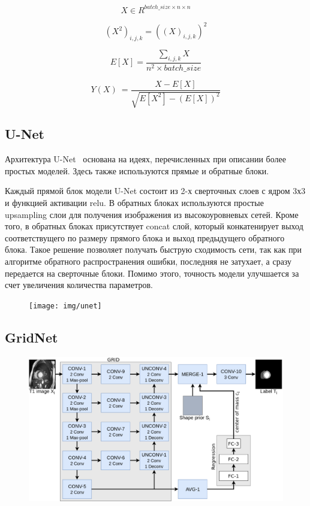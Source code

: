 \begin{equation}
\label{eq:mvn_input_batch}
X\in{}R^{batch\_size\times{}n\times{}n}
\end{equation}

\begin{equation}
\label{eq:mvn_squared_batch}
(X^{2})_{i,j,k}=((X)_{i,j,k})^{2}
\end{equation}

\begin{equation}
\label{eq:mvn_expected_value}
E[X]=\frac{
  \sum_{i,j,k}X
}{
  n^{2}\times{}batch\_size
}
\end{equation} 

\begin{equation}
\label{eq:mvn}
Y(X)\ = \frac{
  X - E[X]
}{\sqrt{
  E[X^{2}] - (E[X])^2
}}
\end{equation}

\subsection{U-Net}

Архитектура U-Net~\cite{unet} основана на идеях, перечисленных при описании более простых моделей. Здесь также используются прямые и обратные блоки. 

Каждый прямой блок модели U-Net состоит из 2-х сверточных слоев с ядром 3х3 и функцией активации relu. В обратных блоках используются простые upsampling слои для получения изображения из высокоуровневых сетей. Кроме того, в обратных блоках присутствует concat слой, который конкатенирует выход соответствущего по размеру прямого блока и выход предыдущего обратного блока. Такое решение позволяет получать быструю сходимость сети, так как при алгоритме обратного распространения ошибки, последняя не затухает, а сразу передается на сверточные блоки. Помимо этого, точность модели улучшается за счет увеличения количества параметров.   

\begin{figure}[hb]
  \texttt{[image: img/unet]}
\end{figure}

\newpage
\subsection{GridNet}

\begin{figure}[ht]
  \includegraphics[width=\textwidth,keepratio]{img/gridnet}
\end{figure}

